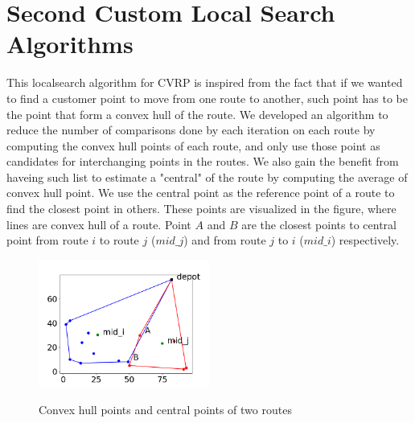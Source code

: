 \documentclass[12pt]{article}
\begin{document}
\section{Second Custom Local Search Algorithms} \label{ls2}
This localsearch algorithm for CVRP is inspired from the fact that if we wanted to find a customer point to move from one route to another, such point has to be the point that form a convex hull of the route. We developed an algorithm to reduce the number of comparisons done by each iteration on each route by computing the convex hull points of each route, and only use those point as candidates for interchanging points in the routes. 
We also gain the benefit from haveing such list to estimate a "central" of the route by computing the average of convex hull point. We use the central point as the reference point of a route to find the closest point in others. These points are visualized in the figure, where lines are convex hull of a route. Point \(A\) and \(B\) are the closest points to central point from route \(i\) to route \(j\) (\(mid\_j\)) and from route \(j\) to \(i\) (\(mid\_i\)) respectively.

\begin{figure}[H]
	\caption{Convex hull points and central points of two routes}
	\centering
	\includegraphics[width=0.5\textwidth]{convexmidclosest.png}
	\label{fig:localsearch1}

\end{figure}
\end{document}
